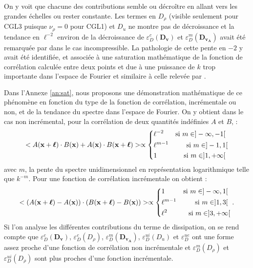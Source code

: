 On y voit que chacune des contributions semble ou décroître en allant vers les grandes échelles ou rester constante. Les termes en $D_{\rho}$ (visible seulement pour CGL3 puisque $\nu_{\rho} = 0$ pour CGL1) et $D_u$ ne montre pas de décroissance et la tendance en $\ell^{-2}$ environ de la décroissance  de $\varepsilon^{c}_{D}(\boldsymbol{D_{v}})$ et $\varepsilon^{m}_{D}(\boldsymbol{D_{v_A}})$ avait été remarquée par \cite{ferrand_multi-scale_2021} dans le cas incompressible. La pathologie de cette pente en $-2$ y avait été identifiée, et associée à une saturation mathématique de la fonction de corrélation calculée entre deux points et due à une puissance de $k$ trop importante dans l'espace de Fourier et similaire à celle relevée par \cite{cho_simulations_2009}. 

Dans l'Annexe \ref{an:sat}, nous proposons une démonstration mathématique de ce phénomène en fonction du type de la fonction de corrélation, incrémentale ou non, et de la tendance du spectre dans l'espace de Fourier. On y obtient dans le cas non incrémental, pour la corrélation de deux quantités indéfinies $A$ et $B$, : 
\begin{eqnarray}
  \label{eq:sat_noninc}  <A({\bf x} + \boldsymbol{\ell})  \cdot B({\bf x}) + A({\bf x})  \cdot B({\bf x} + \boldsymbol{\ell})> 
\propto \left\{
    \begin{split}
    &\ell^{-2}& \textrm{si $m \in ]-\infty,-1[$ } \\
 &\ell^{m-1}&  \textrm{si $m \in ]-1,1[$}  \\
 &1& \textrm{si $m \in ]1,+\infty[$ } 
\end{split}
\right.\nonumber  \\
\end{eqnarray}
avec $m$, la pente du spectre unidimensionnel en représentation logarithmique telle que $k^{-m}$. Pour une fonction de corrélation incrémentale on obtient :
\begin{eqnarray}
   \label{eq:sat_inc} <(A({\bf x} + \boldsymbol{\ell}) - A({\bf x}))\cdot(B({\bf x} + \boldsymbol{\ell}) - B({\bf x})) > 
\propto \left\{
    \begin{split}
    & 1 & \textrm{si $m \in ]-\infty,1[$ } \\
& \ell^{m-1}&  \textrm{si $m \in ]1,3[$ }  \\
& \ell^2 & \textrm{si $m \in ]3,+\infty[$}
\end{split}
\right. .\nonumber\\
\end{eqnarray}
Si l'on analyse les différentes contributions du terme de dissipation, on se rend compte que $ \varepsilon^{c}_{D}(\boldsymbol{D_{v}}) $, $ \varepsilon^{c}_{D}(D_{\rho})$, $\varepsilon^{m}_{D}(\boldsymbol{D_{v_A}}) $,
$ \varepsilon^{ui}_{D}(D_u) $ et $\varepsilon^{ue}_{D}$ ont une forme assez proche d'une fonction de corrélation non incrémentale et $ \varepsilon^{m}_{D}(D_{\rho}) $ et  $\varepsilon^{ui}_{D}(D_{\rho})$ sont plus proches d'une fonction incrémentale. 

